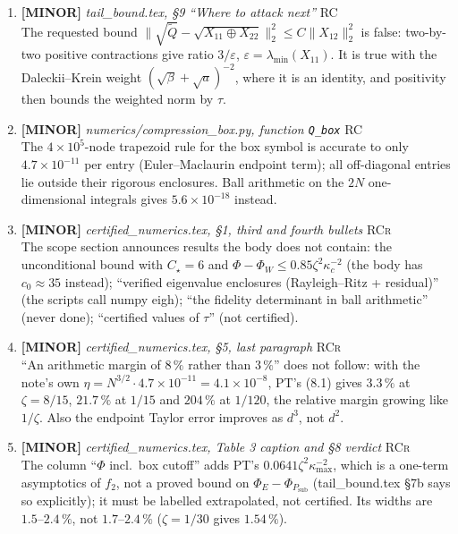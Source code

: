 \documentclass[11pt]{article}
\begin{document}
\begin{enumerate}[leftmargin=1.6em,itemsep=6pt]
\item \textbf{[MINOR]} \emph{tail\_bound.tex, \S9 ``Where to attack next''} \hfill\textsc{RC}\\ The requested bound $\lVert\sqrt{\widetilde Q}-\sqrt{X_{11}\oplus X_{22}}\rVert_2^2\le C\lVert X_{12}\rVert_2^2$ is false: two-by-two positive contractions give ratio $3/\varepsilon$, $\varepsilon=\lambda_{\min}(X_{11})$. It is true with the Daleckii--Krein weight $(\sqrt{\beta}+\sqrt a)^{-2}$, where it is an identity, and positivity then bounds the weighted norm by $\tau$.
\item \textbf{[MINOR]} \emph{numerics/compression\_box.py, function \texttt{Q\_box}} \hfill\textsc{RC}\\ The $4\times10^5$-node trapezoid rule for the box symbol is accurate to only $4.7\times10^{-11}$ per entry (Euler--Maclaurin endpoint term); all off-diagonal entries lie outside their rigorous enclosures. Ball arithmetic on the $2N$ one-dimensional integrals gives $5.6\times10^{-18}$ instead.
\item \textbf{[MINOR]} \emph{certified\_numerics.tex, \S1, third and fourth bullets} \hfill\textsc{RCr}\\ The scope section announces results the body does not contain: the unconditional bound with $C_\star=6$ and $\Phi-\Phi_W\le0.85\zeta^2\kappa_c^{-2}$ (the body has $c_0\approx35$ instead); ``verified eigenvalue enclosures (Rayleigh--Ritz + residual)'' (the scripts call numpy eigh); ``the fidelity determinant in ball arithmetic'' (never done); ``certified values of $\tau$'' (not certified).
\item \textbf{[MINOR]} \emph{certified\_numerics.tex, \S5, last paragraph} \hfill\textsc{RCr}\\ ``An arithmetic margin of $8\,\%$ rather than $3\,\%$'' does not follow: with the note's own $\eta=N^{3/2}\cdot4.7\times10^{-11}=4.1\times10^{-8}$, PT's (8.1) gives $3.3\,\%$ at $\zeta=8/15$, $21.7\,\%$ at $1/15$ and $204\,\%$ at $1/120$, the relative margin growing like $1/\zeta$. Also the endpoint Taylor error improves as $d^3$, not $d^2$.
\item \textbf{[MINOR]} \emph{certified\_numerics.tex, Table 3 caption and \S8 verdict} \hfill\textsc{RCr}\\ The column ``$\Phi$ incl.\ box cutoff'' adds PT's $0.0641\zeta^2\kappa_{\max}^{-2}$, which is a one-term asymptotics of $f_2$, not a proved bound on $\Phi_E-\Phi_{P_{\mathrm{sub}}}$ (tail\_bound.tex \S7b says so explicitly); it must be labelled extrapolated, not certified. Its widths are $1.5$--$2.4\,\%$, not $1.7$--$2.4\,\%$ ($\zeta=1/30$ gives $1.54\,\%$).

\end{enumerate}
\end{document}
